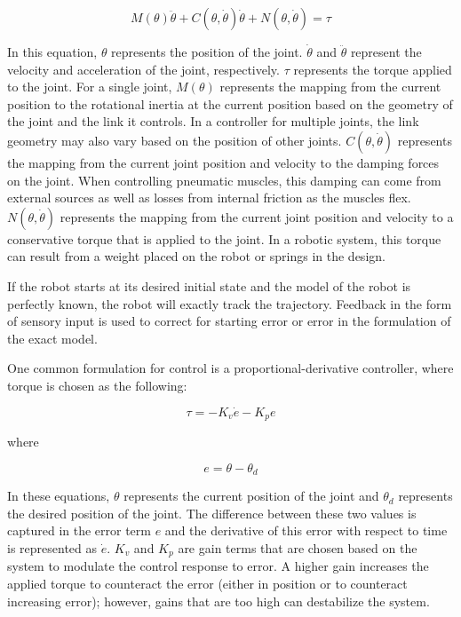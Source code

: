 \begin{equation}
M(\theta) \ddot{\theta} + C(\theta, \dot{\theta}) \dot{\theta} + N(\theta, \dot{\theta}) = \tau
\end{equation}

In this equation, $\theta$ represents the position of the joint. $\dot{\theta}$ and $\ddot{\theta}$ represent the velocity and acceleration of the joint, respectively. $\tau$ represents the torque applied to the joint. For a single joint, $M(\theta)$ represents the mapping from the current position to the rotational inertia at the current position based on the geometry of the joint and the link it controls. In a controller for multiple joints, the link geometry may also vary based on the position of other joints. $C(\theta, \dot{\theta})$ represents the mapping from the current joint position and velocity to the damping forces on the joint. When controlling pneumatic muscles, this damping can come from external sources as well as losses from internal friction as the muscles flex. $N(\theta, \dot{\theta})$ represents the mapping from the current joint position and velocity to a conservative torque that is applied to the joint. In a robotic system, this torque can result from a weight placed on the robot or springs in the design.

If the robot starts at its desired initial state and the model of the robot is
perfectly known, the robot will exactly track the trajectory. Feedback in the 
form of sensory input is used to correct for starting error or error in the 
formulation of the exact model.

One common formulation for control is a proportional-derivative controller, 
where torque is chosen as the following:

\begin{equation}
\tau = -K_{v} \dot{e} - K_{p} e
\end{equation}

where

\begin{equation}
e = \theta - \theta_{d}
\end{equation}

In these equations, $\theta$ represents the current position of the joint and $\theta_{d}$ represents the desired position of the joint. The difference between these two values is captured in the error term $e$ and the derivative of this error with respect to time is represented as $\dot{e}$. $K_{v}$ and $K_{p}$ are gain terms that are chosen based on the system to modulate the control response to error. A higher gain increases the applied torque to counteract the error (either in position or to counteract increasing error); however, gains that are too high can destabilize the system.

